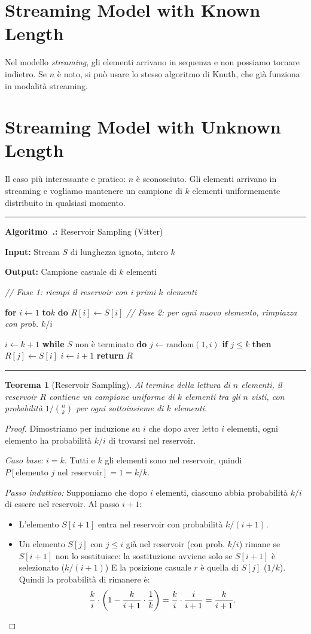 \documentclass[12pt, a4paper, oneside]{book}
\newcounter{algocf}[chapter]
\renewcommand{\thealgocf}{\thechapter.\arabic{algocf}}
\newenvironment{algorithm}[1][H]{%
  \refstepcounter{algocf}%
  \par\medskip\noindent\rule{\linewidth}{0.4pt}\par\smallskip
}{%
  \par\smallskip\noindent\rule{\linewidth}{0.4pt}\par\medskip
}
\newcommand{\algcaption}[1]{\noindent\textbf{Algoritmo~\thealgocf:} #1\par\smallskip}
\newcommand{\KwIn}[1]{\noindent\textbf{Input:} #1\par}
\newcommand{\KwOut}[1]{\noindent\textbf{Output:} #1\par}
\newcommand{\tcp}[1]{{\color{gray}\textit{// #1}}\par}
\newcommand{\For}[1]{\noindent\textbf{for} #1 \textbf{do}}
\newcommand{\While}[1]{\noindent\textbf{while} #1 \textbf{do}}
\newcommand{\If}[1]{\noindent\textbf{if} #1 \textbf{then}}
\newcommand{\Return}[1]{\noindent\textbf{return} #1}
\newcommand{\KwTo}{\textbf{to}}
\theoremstyle{plain}
\newtheorem{teorema}{Teorema}[chapter]
\theoremstyle{definition}
\theoremstyle{remark}
\begin{document}
\section{Streaming Model with Known Length}

Nel modello \emph{streaming}, gli elementi arrivano in sequenza e non possiamo tornare indietro. Se $n$ è noto, si può usare lo stesso algoritmo di Knuth, che già funziona in modalità streaming.

\section{Streaming Model with Unknown Length}

Il caso più interessante e pratico: $n$ è sconosciuto. Gli elementi arrivano in streaming e vogliamo mantenere un campione di $k$ elementi uniformemente distribuito in qualsiasi momento.

\begin{algorithm}[H]
\algcaption{Reservoir Sampling (Vitter)}
\KwIn{Stream $S$ di lunghezza ignota, intero $k$}
\KwOut{Campione casuale di $k$ elementi}
\tcp{Fase 1: riempi il reservoir con i primi $k$ elementi}
\For{$i \leftarrow 1$ \KwTo $k$}{
  $R[i] \leftarrow S[i]$\;
}
\tcp{Fase 2: per ogni nuovo elemento, rimpiazza con prob. $k/i$}
$i \leftarrow k + 1$\;
\While{$S$ non è terminato}{
  $j \leftarrow \mathrm{random}(1, i)$\;
  \If{$j \le k$}{
    $R[j] \leftarrow S[i]$\;
  }
  $i \leftarrow i + 1$\;
}
\Return{$R$}\;
\end{algorithm}

\begin{teorema}[Reservoir Sampling]
Al termine della lettura di $n$ elementi, il reservoir $R$ contiene un campione uniforme di $k$ elementi tra gli $n$ visti, con probabilità $1/\binom{n}{k}$ per ogni sottoinsieme di $k$ elementi.
\end{teorema}
\begin{proof}
Dimostriamo per induzione su $i$ che dopo aver letto $i$ elementi, ogni elemento ha probabilità $k/i$ di trovarsi nel reservoir.

\emph{Caso base:} $i = k$. Tutti e $k$ gli elementi sono nel reservoir, quindi $P[\text{elemento } j \text{ nel reservoir}] = 1 = k/k$. \checkmark

\emph{Passo induttivo:} Supponiamo che dopo $i$ elementi, ciascuno abbia probabilità $k/i$ di essere nel reservoir. Al passo $i+1$:
\begin{itemize}
  \item L'elemento $S[i+1]$ entra nel reservoir con probabilità $k/(i+1)$.
  \item Un elemento $S[j]$ con $j \le i$ già nel reservoir (con prob. $k/i$) rimane se $S[i+1]$ non lo sostituisce: la sostituzione avviene solo se $S[i+1]$ è selezionato ($k/(i+1)$) E la posizione casuale $r$ è quella di $S[j]$ ($1/k$). Quindi la probabilità di rimanere è:
  \[
  \frac{k}{i} \cdot \left(1 - \frac{k}{i+1} \cdot \frac{1}{k}\right) = \frac{k}{i} \cdot \frac{i}{i+1} = \frac{k}{i+1}. \qedhere
  \]
\end{itemize}
\end{proof}
\end{document}

